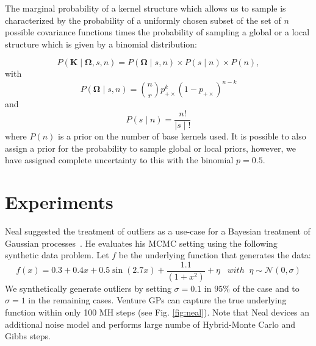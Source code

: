 \documentclass{article} %
\begin{document}
The marginal probability of a kernel structure which allows us to sample  is characterized by the probability of a uniformly chosen subset of the set of $n$ possible covariance functions times the probability of sampling a global or a local structure which is given by a binomial distribution: 

\begin{equation}
P(\mathbf{K} \mid \bm{\Omega},s,n) = P(\bm{\Omega} \mid s,n)\times P(s \mid n) \times P(n),
\end{equation}
with
\begin{equation}
P(\bm{\Omega} \mid s,n)= {n \choose r}  p_{+\times}^k (1 - p_{+\times})^{n-k}
\end{equation}
and
\begin{equation}
P(s \mid n) = \frac{n!}{ \mid s \mid !}
\end{equation}
where $P(n)$ is a prior on the number of base kernels used. It is possible to also assign a prior for the probability to sample global or local priors, however, we have assigned complete uncertainty to this with the binomial $p = 0.5$.

\section{Experiments}

Neal suggested the treatment of outliers as a use-case for a Bayesian treatment of Gaussian processes~\citeyearpar{neal1997monte}. He evaluates his MCMC setting using the following synthetic data problem. Let $f$ be the underlying function that generates the data:
\begin{equation}
f(x) =  0.3 + 0.4 x + 0.5 \sin(2.7x) + \frac{1.1}{(1+ x^2)} + \eta \;\;\; with\;\;\eta \sim \mathcal{N}(0,\sigma)
\end{equation}
We synthetically generate outliers by setting $\sigma = 0.1$ in $95\%$ of the case and to $\sigma = 1$ in the remaining cases. Venture GPs can capture the true underlying function within only 100 MH steps (see Fig. \ref{fig:neal}). Note that Neal devices an additional noise model and performs large numbe of Hybrid-Monte Carlo and Gibbs steps.  
\end{document}
